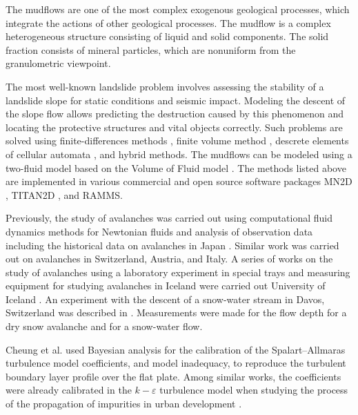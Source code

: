 \documentclass[applsci,article,submit,moreauthors,pdftex]{Definitions/mdpi}
\begin{document}
The mudflows are one of the most complex exogenous geological processes, which integrate the actions of other geological processes. The mudflow is a complex heterogeneous structure consisting of liquid and solid components. The solid fraction consists of mineral particles, which are nonuniform from the granulometric viewpoint.


The most well-known landslide problem involves assessing the stability of a landslide slope for static conditions and seismic impact. Modeling the descent of the slope flow allows predicting the destruction caused by this phenomenon and locating the protective structures and vital objects correctly. Such problems are solved using finite-differences methods \cite{Bernander2016}, finite volume method \cite{liu2007application}, descrete elements \cite{Liu2020} of cellular automata \cite{piegari2006cellular}, and hybrid methods. The mudflows can be modeled using a two-fluid model based on the Volume of Fluid model \cite{Hirt1981}. The methods listed above are implemented in various commercial and open source software packages MN2D \cite{Naaim2002}, TITAN2D \cite{Pitman2003}, and RAMMS.

Previously, the study of avalanches was carried out using computational fluid dynamics methods for Newtonian fluids and analysis of observation data including the historical data on avalanches in Japan \cite{Oda2011, Yamaguchi2017}. Similar work was carried out on avalanches in Switzerland, Austria, and Italy. A series of works on the study of avalanches using a laboratory experiment in special trays and measuring equipment for studying avalanches in Iceland were carried out University of Iceland  \cite{IceThesKatr, IceThesJon}. An experiment with the descent of a snow-water stream in Davos, Switzerland was described in \cite{Jaedicke2006}. Measurements were made for the flow depth for a dry snow avalanche and for a snow-water flow.

Cheung et al. \cite{Cheung2011} used Bayesian analysis for the calibration of the Spalart–Allmaras turbulence model coefficients, and model inadequacy, to reproduce the turbulent boundary layer profile over the flat plate. Among similar works, the coefficients were already calibrated in the $k-\varepsilon$ turbulence model when studying the process of the propagation of impurities in urban development \cite{Guillas2014}.
\end{document}
